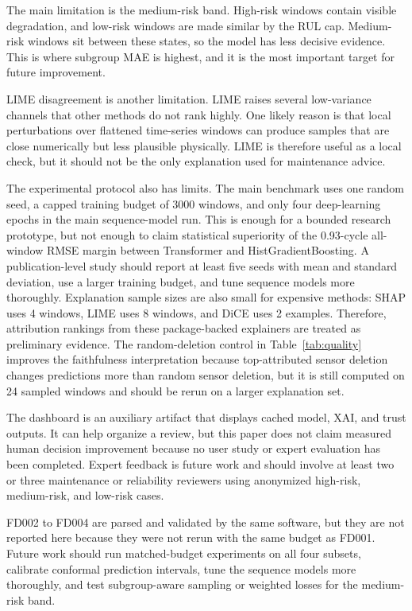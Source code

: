 \documentclass[conference]{IEEEtran}
\begin{document}
The main limitation is the medium-risk band. High-risk windows contain visible degradation, and low-risk windows are made similar by the RUL cap. Medium-risk windows sit between these states, so the model has less decisive evidence. This is where subgroup MAE is highest, and it is the most important target for future improvement.

LIME disagreement is another limitation. LIME raises several low-variance channels that other methods do not rank highly. One likely reason is that local perturbations over flattened time-series windows can produce samples that are close numerically but less plausible physically. LIME is therefore useful as a local check, but it should not be the only explanation used for maintenance advice.

The experimental protocol also has limits. The main benchmark uses one random seed, a capped training budget of 3000 windows, and only four deep-learning epochs in the main sequence-model run. This is enough for a bounded research prototype, but not enough to claim statistical superiority of the 0.93-cycle all-window RMSE margin between Transformer and HistGradientBoosting. A publication-level study should report at least five seeds with mean and standard deviation, use a larger training budget, and tune sequence models more thoroughly. Explanation sample sizes are also small for expensive methods: SHAP uses 4 windows, LIME uses 8 windows, and DiCE uses 2 examples. Therefore, attribution rankings from these package-backed explainers are treated as preliminary evidence. The random-deletion control in Table~\ref{tab:quality} improves the faithfulness interpretation because top-attributed sensor deletion changes predictions more than random sensor deletion, but it is still computed on 24 sampled windows and should be rerun on a larger explanation set.

The dashboard is an auxiliary artifact that displays cached model, XAI, and trust outputs. It can help organize a review, but this paper does not claim measured human decision improvement because no user study or expert evaluation has been completed. Expert feedback is future work and should involve at least two or three maintenance or reliability reviewers using anonymized high-risk, medium-risk, and low-risk cases.

FD002 to FD004 are parsed and validated by the same software, but they are not reported here because they were not rerun with the same budget as FD001. Future work should run matched-budget experiments on all four subsets, calibrate conformal prediction intervals, tune the sequence models more thoroughly, and test subgroup-aware sampling or weighted losses for the medium-risk band.
\end{document}

